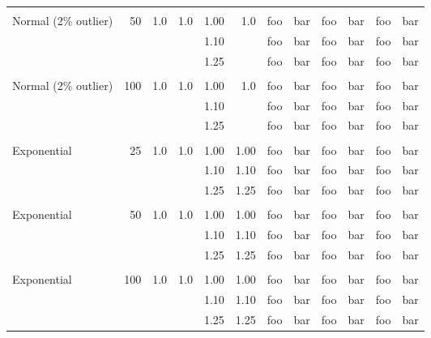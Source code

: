 \documentclass{report}
\begin{document}
\begin{table}[h]
\begin{threeparttable}
\begin{tabular}{|l r r r r r r r r r r r|}
		& & & & & & & & & & & \\

		Normal (2\% outlier) & 50 & 1.0 & 1.0 & 1.00 & 1.0 & foo & bar & foo & bar & foo & bar \\
		       &    &     &     & 1.10 &     & foo & bar & foo & bar & foo & bar \\
		       &    &     &     & 1.25 &     & foo & bar & foo & bar & foo & bar \\

		& & & & & & & & & & & \\

		Normal (2\% outlier) & 100 & 1.0 & 1.0 & 1.00 & 1.0 & foo & bar & foo & bar& foo & bar \\ 
		       &    &     &     & 1.10 &      & foo & bar & foo & bar & foo & bar \\
		       &    &     &     & 1.25 &      & foo & bar & foo & bar & foo & bar \\

		& & & & & & & & & & & \\

		Exponential & 25 & 1.0 & 1.0 & 1.00 & 1.00 & foo & bar & foo & bar& foo & bar \\
		       &    &     &     & 1.10 & 1.10     & foo & bar & foo & bar & foo & bar \\
		       &    &     &     & 1.25 & 1.25    & foo & bar & foo & bar & foo & bar \\

		& & & & & & & & & & & \\
		
		Exponential & 50 & 1.0 & 1.0 & 1.00 & 1.00 & foo & bar & foo & bar & foo & bar \\
		       &    &     &     & 1.10 & 1.10    & foo & bar & foo & bar & foo & bar \\
		       &    &     &     & 1.25 & 1.25    & foo & bar & foo & bar & foo & bar \\

		& & & & & & & & & & & \\

		Exponential & 100 & 1.0 & 1.0 & 1.00 & 1.00 & foo & bar & foo & bar & foo & bar \\
		       &    &     &     & 1.10 & 1.10      & foo & bar & foo & bar & foo & bar \\
		       &    &     &     & 1.25 & 1.25     & foo & bar & foo & bar & foo & bar \\


\end{tabular}
\end{threeparttable}
\end{table}
\end{document}
